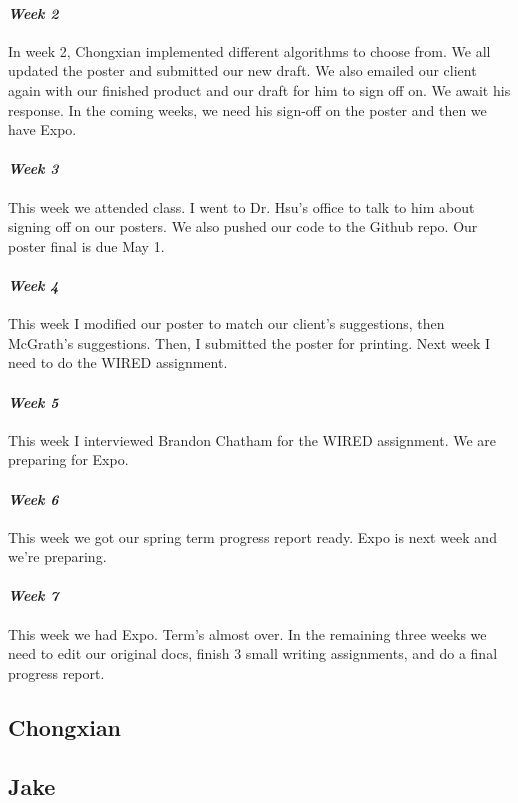 \documentclass[onecolumn, draftclsnofoot,10pt, compsoc]{IEEEtran}
\begin{document}
\paragraph{\emph{Week 2}}
In week 2, Chongxian implemented different algorithms to choose from. We all updated the poster and submitted our new draft. We also emailed our client again with our finished product and our draft for him to sign off on. We await his response. In the coming weeks, we need his sign-off on the poster and then we have Expo.
\paragraph{\emph{Week 3}}
This week we attended class. I went to Dr. Hsu's office to talk to him about signing off on our posters. We also pushed our code to the Github repo. Our poster final is due May 1.
\paragraph{\emph{Week 4}}
This week I modified our poster to match our client's suggestions, then McGrath's suggestions. Then, I submitted the poster for printing. Next week I need to do the WIRED assignment.
\paragraph{\emph{Week 5}}
This week I interviewed Brandon Chatham for the WIRED assignment. We are preparing for Expo.
\paragraph{\emph{Week 6}}
This week we got our spring term progress report ready. Expo is next week and we're preparing.
\paragraph{\emph{Week 7}}
This week we had Expo. Term's almost over. In the remaining three weeks we need to edit our original docs, finish 3 small writing assignments, and do a final progress report.
\subsection{Chongxian}

\subsection{Jake}
\end{document}
